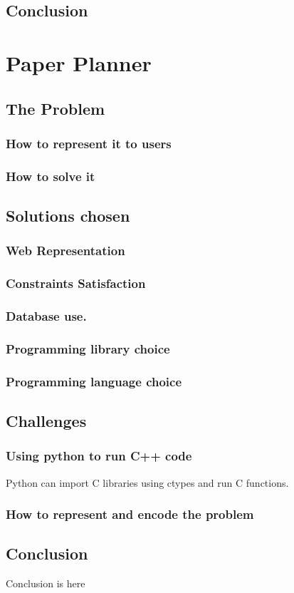\documentclass[11pt]{article}
\begin{document}
\subsection{Conclusion}
\label{sec-2_4}
\section{Paper Planner}
\label{sec-3}
\subsection{The Problem}
\label{sec-3_1}
\subsubsection{How to represent it to users}
\label{sec-3_1_1}
\subsubsection{How to solve it}
\label{sec-3_1_2}
\subsection{Solutions chosen}
\label{sec-3_2}
\subsubsection{Web Representation}
\label{sec-3_2_1}
\subsubsection{Constraints Satisfaction}
\label{sec-3_2_2}
\subsubsection{Database use.}
\label{sec-3_2_3}
\subsubsection{Programming library choice}
\label{sec-3_2_4}
\subsubsection{Programming language choice}
\label{sec-3_2_5}
\subsection{Challenges}
\label{sec-3_3}
\subsubsection{Using python to run C++ code}
\label{sec-3_3_1}

Python can import C libraries using ctypes and run C functions.
\subsubsection{How to represent and encode the problem}
\label{sec-3_3_2}
\subsection{Conclusion}
\label{sec-3_4}

Conclusion is here
\end{document}
